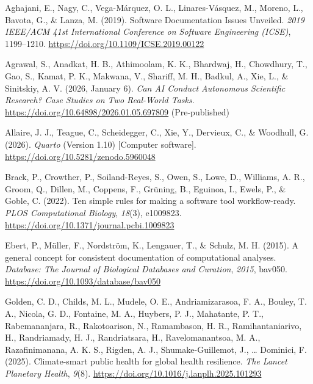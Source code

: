 \documentclass[
  man,
  floatsintext,
  longtable,
  nolmodern,
  notxfonts,
  notimes,
  12pt,
  colorlinks=true,linkcolor=blue,citecolor=blue,urlcolor=blue]{apa7}
\newlength{\cslhangindent}
\newenvironment{CSLReferences}[2] %
 {\begin{list}{}{%
  \setlength{\itemindent}{0pt}
  \setlength{\leftmargin}{0pt}
  \setlength{\parsep}{0pt}
  \ifodd #1
   \setlength{\leftmargin}{\cslhangindent}
   \setlength{\itemindent}{-1\cslhangindent}
  \fi
  \setlength{\itemsep}{#2\baselineskip}}}
 {\end{list}}
\begin{document}
\protect{}\label{refs}
\begin{CSLReferences}{1}{0}
Aghajani, E., Nagy, C., Vega-Márquez, O. L., Linares-Vásquez, M.,
Moreno, L., Bavota, G., \& Lanza, M. (2019). Software {Documentation
Issues Unveiled}. \emph{2019 {IEEE}/{ACM} 41st {International
Conference} on {Software Engineering} ({ICSE})}, 1199--1210.
\url{https://doi.org/10.1109/ICSE.2019.00122}

Agrawal, S., Anadkat, H. B., Athimoolam, K. K., Bhardwaj, H., Chowdhury,
T., Gao, S., Kamat, P. K., Makwana, V., Shariff, M. H., Badkul, A., Xie,
L., \& Sinitskiy, A. V. (2026, January 6). \emph{Can {AI Conduct
Autonomous Scientific Research}? {Case Studies} on {Two Real-World
Tasks}}. \url{https://doi.org/10.64898/2026.01.05.697809}
(Pre-published)

Allaire, J. J., Teague, C., Scheidegger, C., Xie, Y., Dervieux, C., \&
Woodhull, G. (2026). \emph{Quarto} (Version 1.10) {[}Computer
software{]}. \url{https://doi.org/10.5281/zenodo.5960048}

Brack, P., Crowther, P., Soiland-Reyes, S., Owen, S., Lowe, D.,
Williams, A. R., Groom, Q., Dillen, M., Coppens, F., Grüning, B.,
Eguinoa, I., Ewels, P., \& Goble, C. (2022). Ten simple rules for making
a software tool workflow-ready. \emph{PLOS Computational Biology},
\emph{18}(3), e1009823.
\url{https://doi.org/10.1371/journal.pcbi.1009823}

Ebert, P., Müller, F., Nordström, K., Lengauer, T., \& Schulz, M. H.
(2015). A general concept for consistent documentation of computational
analyses. \emph{Database: The Journal of Biological Databases and
Curation}, \emph{2015}, bav050.
\url{https://doi.org/10.1093/database/bav050}

Golden, C. D., Childs, M. L., Mudele, O. E., Andriamizarasoa, F. A.,
Bouley, T. A., Nicola, G. D., Fontaine, M. A., Huybers, P. J.,
Mahatante, P. T., Rabemananjara, R., Rakotoarison, N., Ramambason, H.
R., Ramihantaniarivo, H., Randriamady, H. J., Randriatsara, H.,
Ravelomanantsoa, M. A., Razafinimanana, A. K. S., Rigden, A. J.,
Shumake-Guillemot, J., \ldots{} Dominici, F. (2025). Climate-smart
public health for global health resilience. \emph{The Lancet Planetary
Health}, \emph{9}(8). \url{https://doi.org/10.1016/j.lanplh.2025.101293}


\end{CSLReferences}
\end{document}
